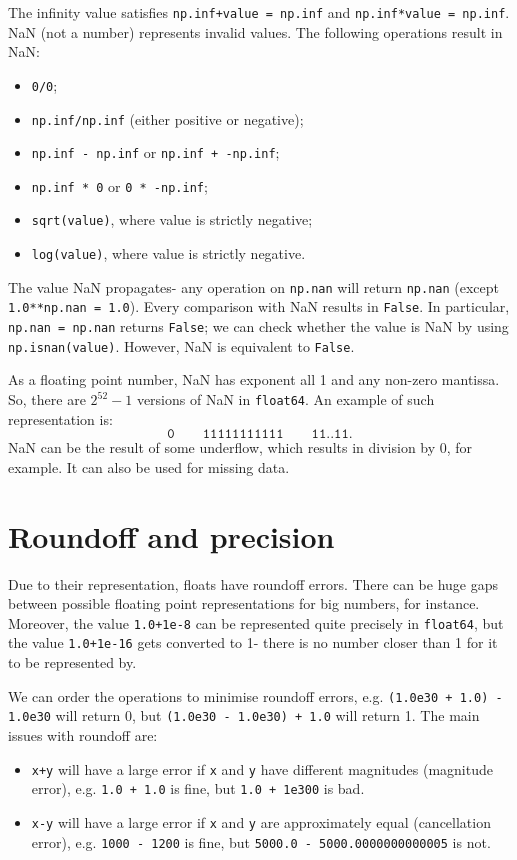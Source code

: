 \documentclass[a4paper, openany]{memoir}
\begin{document}
    The infinity value satisfies \texttt{np.inf+value = np.inf} and \texttt{np.inf*value = np.inf}. NaN (not a number) represents invalid values. The following operations result in NaN:
    \begin{itemize}
        \item \texttt{0/0};
        \item \texttt{np.inf/np.inf} (either positive or negative);
        \item \texttt{np.inf - np.inf} or \texttt{np.inf + -np.inf};
        \item \texttt{np.inf * 0} or \texttt{0 * -np.inf};
        \item \texttt{sqrt(value)}, where value is strictly negative;
        \item \texttt{log(value)}, where value is strictly negative.
    \end{itemize}
    The value NaN propagates- any operation on \texttt{np.nan} will return \texttt{np.nan} (except \texttt{1.0**np.nan = 1.0}). Every comparison with NaN results in \texttt{False}. In particular, \texttt{np.nan = np.nan} returns \texttt{False}; we can check whether the value is NaN by using \texttt{np.isnan(value)}. However, NaN is equivalent to \texttt{False}.

    As a floating point number, NaN has exponent all 1 and any non-zero mantissa. So, there are $2^{52} - 1$ versions of NaN in \texttt{float64}. An example of such representation is:
    \[\texttt{0} \qquad \texttt{11111111111} \qquad \texttt{11..11}.\]        
    NaN can be the result of some underflow, which results in division by 0, for example. It can also be used for missing data.

    \section{Roundoff and precision}
    Due to their representation, floats have roundoff errors. There can be huge gaps between possible floating point representations for big numbers, for instance. Moreover, the value \texttt{1.0+1e-8} can be represented quite precisely in \texttt{float64}, but the value \texttt{1.0+1e-16} gets converted to 1- there is no number closer than 1 for it to be represented by.

    We can order the operations to minimise roundoff errors, e.g. \texttt{(1.0e30 + 1.0) - 1.0e30} will return 0, but \texttt{(1.0e30 - 1.0e30) + 1.0} will return 1. The main issues with roundoff are:
    \begin{itemize}
        \item \texttt{x+y} will have a large error if \texttt{x} and \texttt{y} have different magnitudes (magnitude error), e.g. \texttt{1.0 + 1.0} is fine, but \texttt{1.0 + 1e300} is bad.
        \item \texttt{x-y} will have a large error if \texttt{x} and \texttt{y} are approximately equal (cancellation error), e.g. \texttt{1000 - 1200} is fine, but \texttt{5000.0 - 5000.0000000000005} is not.
    \end{itemize}
\end{document}
